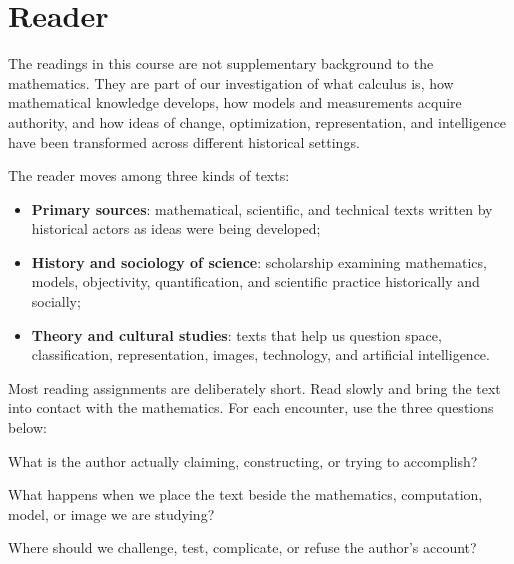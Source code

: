 %
%     
%
%     
%

\section{Reader}

The readings in this course are not supplementary background to the
mathematics. They are part of our investigation of what calculus is, how
mathematical knowledge develops, how models and measurements acquire authority,
and how ideas of change, optimization, representation, and intelligence have
been transformed across different historical settings.

The reader moves among three kinds of texts:

\begin{itemize}[leftmargin=*]
    \item \textbf{Primary sources}: mathematical, scientific, and technical
    texts written by historical actors as ideas were being developed;
    \item \textbf{History and sociology of science}: scholarship examining
    mathematics, models, objectivity, quantification, and scientific practice
    historically and socially;
    \item \textbf{Theory and cultural studies}: texts that help us question
    space, classification, representation, images, technology, and artificial
    intelligence.
\end{itemize}

Most reading assignments are deliberately short. Read slowly and bring the
text into contact with the mathematics. For each encounter, use the three
questions below:

\begin{description}[leftmargin=1.15in,style=nextline]
    \item[\textcolor{LangRed}{READ}] What is the author actually claiming,
    constructing, or trying to accomplish?
    \item[\textcolor{LangRed}{CONNECT}] What happens when we place the text
    beside the mathematics, computation, model, or image we are studying?
    \item[\textcolor{LangRed}{QUESTION}] Where should we challenge, test,
    complicate, or refuse the author's account?
\end{description}

